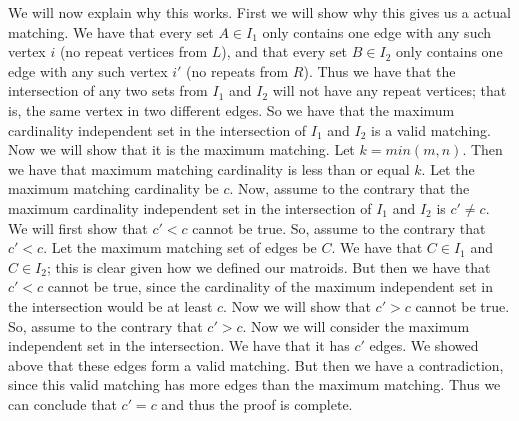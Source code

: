 \documentclass{article}
\begin{document}
We will now explain why this works. First we will show why this gives us a
actual matching. We have that every set $A \in I_1$ only contains one edge with
any such vertex $i$ (no repeat vertices from $L$), and that every set $B \in I_2$
only contains one edge with any such vertex $i'$ (no repeats from $R$). Thus
we have that the intersection of any two sets from
$I_1$ and $I_2$ will not have any repeat vertices; that is, the same vertex in
two different edges. So we have that the maximum cardinality independent set in
the intersection of $I_1$ and $I_2$ is a valid matching. Now we will show that
it is the maximum matching. Let $k = min(m,n)$. Then we have that maximum
matching cardinality is less than or equal $k$. Let the maximum matching
cardinality be $c$. Now, assume to the contrary that the maximum cardinality
independent set in the intersection of $I_1$ and $I_2$ is $c' \neq c$. We will
first show that $c' < c$ cannot be true. So, assume to the contrary that $c' <
c$. Let the
maximum matching set of edges be $C$. We have that $C \in I_1$ and $C \in I_2$;
this is clear given how we defined our matroids.
But then we have that $c' < c$ cannot be true, since the
cardinality of the maximum independent set in the intersection would be at least
$c$. Now we will show that $c' > c$ cannot be true. So, assume to the contrary
that $c' > c$. Now we will consider the maximum independent set in the
intersection. We have that it has $c'$ edges. We showed above that these edges
form a valid matching. But then we have a contradiction, since this valid
matching has more edges than the maximum matching. Thus we can conclude that
$c'=c$ and thus the proof is complete.
\newpage

\end{document}
